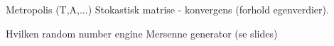 
Metropolis (T,A,...)
	Stokastisk matrise  - konvergens (forhold egenverdier).
	
	Hvilken random number engine
			Mersenne generator (se slides)